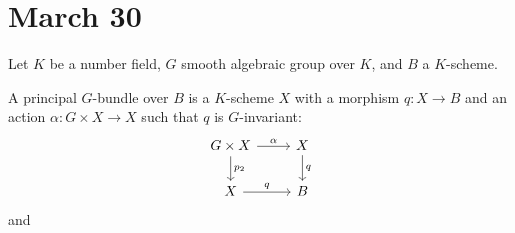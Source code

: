 \section{March 30}

 Let $K$ be a number field, $G$ smooth algebraic group over $K$, and $B$ a $K$-scheme.

 \begin{definition}
  A principal $G$-bundle over $B$ is a $K$-scheme $X$ with a morphism $q: X \to B$ and an action $\alpha: G \times X \to X$ such that $q$ is $G$-invariant:
  \[
   \begin{tikzcd}
    G \times X \arrow[r, "\alpha"] \arrow[d, "p_2"] & X \arrow[d, "q"] \\
    X \arrow[r, "q"] & B
   \end{tikzcd} 
  \]
  and 
 \end{definition}
